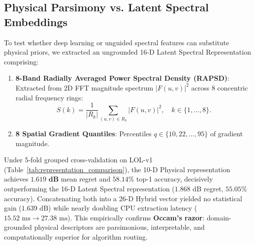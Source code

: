 \documentclass[journal]{IEEEtran}
\begin{document}
\subsection{Physical Parsimony vs. Latent Spectral Embeddings}
To test whether deep learning or unguided spectral features can substitute physical priors, we extracted an ungrounded 16-D Latent Spectral Representation comprising:
\begin{enumerate}
    \item \textbf{8-Band Radially Averaged Power Spectral Density (RAPSD)}: Extracted from 2D FFT magnitude spectrum $|F(u, v)|^2$ across 8 concentric radial frequency rings:
    \begin{equation}
    S(k) = \frac{1}{|R_k|} \sum_{(u, v) \in R_k} |F(u, v)|^2, \quad k \in \{1, \dots, 8\}.
    \end{equation}
    \item \textbf{8 Spatial Gradient Quantiles}: Percentiles $q \in \{10, 22, \dots, 95\}$ of gradient magnitude.
\end{enumerate}

Under 5-fold grouped cross-validation on LOL-v1 (Table~\ref{tab:representation_comparison}), the 10-D Physical representation achieves $\mathbf{1.619\text{ dB}}$ mean regret and $58.14\%$ top-1 accuracy, decisively outperforming the 16-D Latent Spectral representation ($1.868\text{ dB}$ regret, $55.05\%$ accuracy). Concatenating both into a 26-D Hybrid vector yielded no statistical gain ($1.639\text{ dB}$) while nearly doubling CPU extraction latency ($15.52\text{ ms} \to 27.38\text{ ms}$). This empirically confirms \textbf{Occam's razor}: domain-grounded physical descriptors are parsimonious, interpretable, and computationally superior for algorithm routing.

\begin{table}[!t]
\caption{Representation Comparison: 5-Fold GroupKFold Cross-Validation on LOL-v1.}
\label{tab:representation_comparison}
\centering
{}
\end{table}
\end{document}
